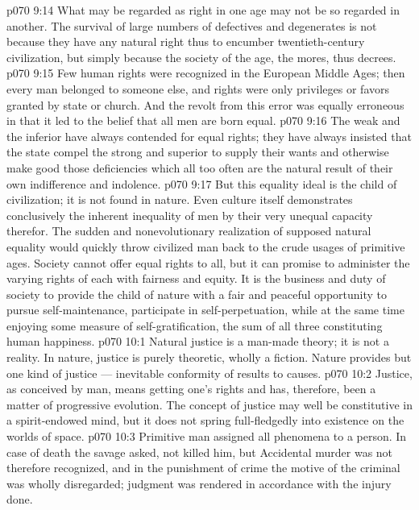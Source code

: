 \vs p070 9:14 What may be regarded as right in one age may not be so regarded in another. The survival of large numbers of defectives and degenerates is not because they have any natural right thus to encumber twentieth\hyp{}century civilization, but simply because the society of the age, the mores, thus decrees.
\vs p070 9:15 Few human rights were recognized in the European Middle Ages; then every man belonged to someone else, and rights were only privileges or favors granted by state or church. And the revolt from this error was equally erroneous in that it led to the belief that all men are born equal.
\vs p070 9:16 The weak and the inferior have always contended for equal rights; they have always insisted that the state compel the strong and superior to supply their wants and otherwise make good those deficiencies which all too often are the natural result of their own indifference and indolence.
\vs p070 9:17 But this equality ideal is the child of civilization; it is not found in nature. Even culture itself demonstrates conclusively the inherent inequality of men by their very unequal capacity therefor. The sudden and nonevolutionary realization of supposed natural equality would quickly throw civilized man back to the crude usages of primitive ages. Society cannot offer equal rights to all, but it can promise to administer the varying rights of each with fairness and equity. It is the business and duty of society to provide the child of nature with a fair and peaceful opportunity to pursue self\hyp{}maintenance, participate in self\hyp{}perpetuation, while at the same time enjoying some measure of self\hyp{}gratification, the sum of all three constituting human happiness.
\vs p070 10:1 Natural justice is a man\hyp{}made theory; it is not a reality. In nature, justice is purely theoretic, wholly a fiction. Nature provides but one kind of justice --- inevitable conformity of results to causes.
\vs p070 10:2 Justice, as conceived by man, means getting one’s rights and has, therefore, been a matter of progressive evolution. The concept of justice may well be constitutive in a spirit\hyp{}endowed mind, but it does not spring full\hyp{}fledgedly into existence on the worlds of space.
\vs p070 10:3 Primitive man assigned all phenomena to a person. In case of death the savage asked, not  killed him, but  Accidental murder was not therefore recognized, and in the punishment of crime the motive of the criminal was wholly disregarded; judgment was rendered in accordance with the injury done.

